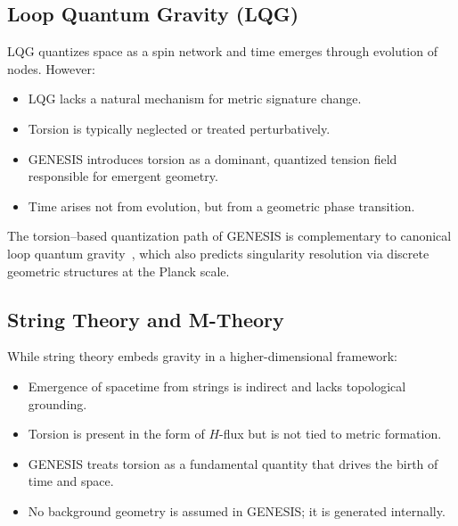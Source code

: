 \documentclass{article}
\begin{document}
\subsection{Loop Quantum Gravity (LQG)} LQG quantizes space as a spin network and time emerges through evolution of nodes. However: \begin{itemize} \item LQG lacks a natural mechanism for metric signature change. \item Torsion is typically neglected or treated perturbatively. \item GENESIS introduces torsion as a dominant, quantized tension field responsible for emergent geometry. \item Time arises not from evolution, but from a geometric phase transition. \end{itemize}

The torsion–based quantization path of GENESIS is complementary to canonical loop quantum gravity~\cite{ashtekar2022,rovelli2004,thiemann2007}, which also predicts singularity resolution via discrete geometric structures at the Planck scale.


\medskip
\begin{center}
\end{center}
\medskip


\subsection{String Theory and M-Theory} While string theory embeds gravity in a higher-dimensional framework: \begin{itemize} \item Emergence of spacetime from strings is indirect and lacks topological grounding. \item Torsion is present in the form of $H$-flux but is not tied to metric formation. \item GENESIS treats torsion as a fundamental quantity that drives the birth of time and space. \item No background geometry is assumed in GENESIS; it is generated internally. \end{itemize}
\end{document}
